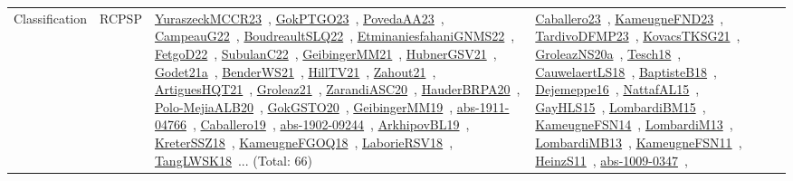 {\begin{longtable}{lp{3cm}>{\raggedright\arraybackslash}p{6cm}>{\raggedright\arraybackslash}p{6cm}>{\raggedright\arraybackslash}p{8cm}}
Classification & RCPSP & \href{../works/YuraszeckMCCR23.pdf}{YuraszeckMCCR23}~\cite{YuraszeckMCCR23}, \href{../works/GokPTGO23.pdf}{GokPTGO23}~\cite{GokPTGO23}, \href{../works/PovedaAA23.pdf}{PovedaAA23}~\cite{PovedaAA23}, \href{../works/CampeauG22.pdf}{CampeauG22}~\cite{CampeauG22}, \href{../works/BoudreaultSLQ22.pdf}{BoudreaultSLQ22}~\cite{BoudreaultSLQ22}, \href{../works/EtminaniesfahaniGNMS22.pdf}{EtminaniesfahaniGNMS22}~\cite{EtminaniesfahaniGNMS22}, \href{../works/FetgoD22.pdf}{FetgoD22}~\cite{FetgoD22}, \href{../works/SubulanC22.pdf}{SubulanC22}~\cite{SubulanC22}, \href{../works/GeibingerMM21.pdf}{GeibingerMM21}~\cite{GeibingerMM21}, \href{../works/HubnerGSV21.pdf}{HubnerGSV21}~\cite{HubnerGSV21}, \href{../works/Godet21a.pdf}{Godet21a}~\cite{Godet21a}, \href{../works/BenderWS21.pdf}{BenderWS21}~\cite{BenderWS21}, \href{../works/HillTV21.pdf}{HillTV21}~\cite{HillTV21}, \href{../works/Zahout21.pdf}{Zahout21}~\cite{Zahout21}, \href{../works/ArtiguesHQT21.pdf}{ArtiguesHQT21}~\cite{ArtiguesHQT21}, \href{../works/Groleaz21.pdf}{Groleaz21}~\cite{Groleaz21}, \href{../works/ZarandiASC20.pdf}{ZarandiASC20}~\cite{ZarandiASC20}, \href{../works/HauderBRPA20.pdf}{HauderBRPA20}~\cite{HauderBRPA20}, \href{../works/Polo-MejiaALB20.pdf}{Polo-MejiaALB20}~\cite{Polo-MejiaALB20}, \href{../works/GokGSTO20.pdf}{GokGSTO20}~\cite{GokGSTO20}, \href{../works/GeibingerMM19.pdf}{GeibingerMM19}~\cite{GeibingerMM19}, \href{../works/abs-1911-04766.pdf}{abs-1911-04766}~\cite{abs-1911-04766}, \href{../works/Caballero19.pdf}{Caballero19}~\cite{Caballero19}, \href{../works/abs-1902-09244.pdf}{abs-1902-09244}~\cite{abs-1902-09244}, \href{../works/ArkhipovBL19.pdf}{ArkhipovBL19}~\cite{ArkhipovBL19}, \href{../works/KreterSSZ18.pdf}{KreterSSZ18}~\cite{KreterSSZ18}, \href{../works/KameugneFGOQ18.pdf}{KameugneFGOQ18}~\cite{KameugneFGOQ18}, \href{../works/LaborieRSV18.pdf}{LaborieRSV18}~\cite{LaborieRSV18}, \href{../works/TangLWSK18.pdf}{TangLWSK18}~\cite{TangLWSK18}... (Total: 66) & \href{../works/Caballero23.pdf}{Caballero23}~\cite{Caballero23}, \href{../works/KameugneFND23.pdf}{KameugneFND23}~\cite{KameugneFND23}, \href{../works/TardivoDFMP23.pdf}{TardivoDFMP23}~\cite{TardivoDFMP23}, \href{../works/KovacsTKSG21.pdf}{KovacsTKSG21}~\cite{KovacsTKSG21}, \href{../works/GroleazNS20a.pdf}{GroleazNS20a}~\cite{GroleazNS20a}, \href{../works/Tesch18.pdf}{Tesch18}~\cite{Tesch18}, \href{../works/CauwelaertLS18.pdf}{CauwelaertLS18}~\cite{CauwelaertLS18}, \href{../works/BaptisteB18.pdf}{BaptisteB18}~\cite{BaptisteB18}, \href{../works/Dejemeppe16.pdf}{Dejemeppe16}~\cite{Dejemeppe16}, \href{../works/NattafAL15.pdf}{NattafAL15}~\cite{NattafAL15}, \href{../works/GayHLS15.pdf}{GayHLS15}~\cite{GayHLS15}, \href{../works/LombardiBM15.pdf}{LombardiBM15}~\cite{LombardiBM15}, \href{../works/KameugneFSN14.pdf}{KameugneFSN14}~\cite{KameugneFSN14}, \href{../works/LombardiM13.pdf}{LombardiM13}~\cite{LombardiM13}, \href{../works/LombardiMB13.pdf}{LombardiMB13}~\cite{LombardiMB13}, \href{../works/KameugneFSN11.pdf}{KameugneFSN11}~\cite{KameugneFSN11}, \href{../works/HeinzS11.pdf}{HeinzS11}~\cite{HeinzS11}, \href{../works/abs-1009-0347.pdf}{abs-1009-0347}~\cite{abs-1009-0347}, 
\end{longtable}}
